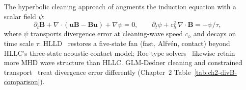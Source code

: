The hyperbolic cleaning approach of \citet{dedner_2002} augments the induction equation with a scalar field \(\psi\):
\begin{equation}\label{eq:ch3-dedner-cleaning}
  \partial_t \mathbf{B} + \nabla\cdot(\mathbf{u}\mathbf{B}-\mathbf{B}\mathbf{u}) + \nabla\psi = 0,\qquad
  \partial_t \psi + c_h^2\,\nabla\cdot\mathbf{B} = -\psi/\tau,
\end{equation}
where \(\psi\) transports divergence error at cleaning-wave speed \(c_h\) and decays on time scale \(\tau\). HLLD~\citep{miyoshi_kusano_2005} restores a five-state fan (fast, Alfv\'en, contact) beyond HLLC's three-state acoustic-contact model; Roe-type solvers~\citep{roe_1981} likewise retain more MHD wave structure than HLLC. GLM-Dedner cleaning and constrained transport~\citep{evans_hawley_1988} treat divergence error differently (Chapter~2 Table~\ref{tab:ch2-divB-comparison}).

